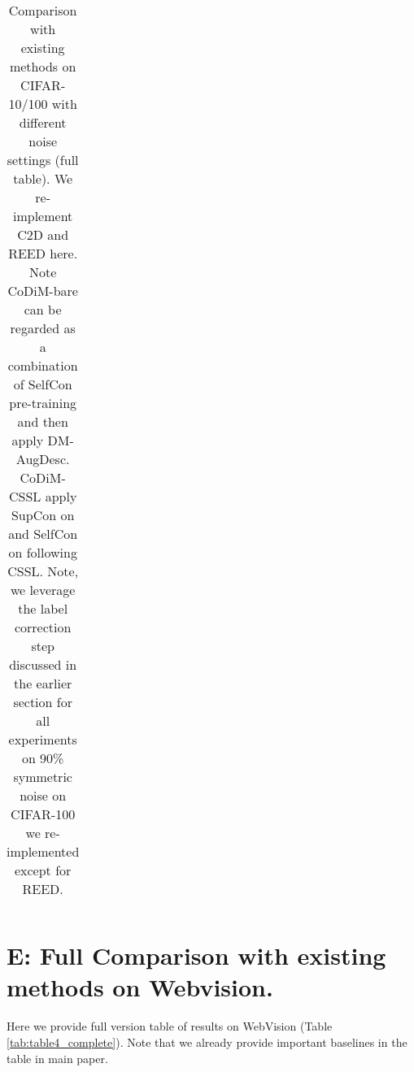 \documentclass[letterpaper]{article} \usepackage{aaai22}  \usepackage{times}  \usepackage{helvet}  \usepackage{courier}  \usepackage[hyphens]{url}  \usepackage{graphicx} \usepackage{subfigure}
\begin{document}
\begin{table*}[h]
\begin{center}
\begin{tabular}{lcccccccccc}
\hline
\end{tabular}
\end{center}
\caption{Comparison with existing methods on CIFAR-10/100 with different noise settings (full table). We re-implement C2D and REED here. Note CoDiM-bare can be regarded as a combination of SelfCon pre-training and then apply DM-AugDesc. CoDiM-CSSL apply SupCon on  and SelfCon on  following CSSL. Note, we leverage the label correction step discussed in the earlier section for all experiments on 90\% symmetric noise on CIFAR-100 we re-implemented except for REED.}
\label{tab:table2_complete}
\end{table*}


\section{E: Full Comparison with existing methods on Webvision.}
Here we provide full version table of results on WebVision (Table \ref{tab:table4_complete}). Note that we already provide important baselines in the table in main paper.
\end{document}
